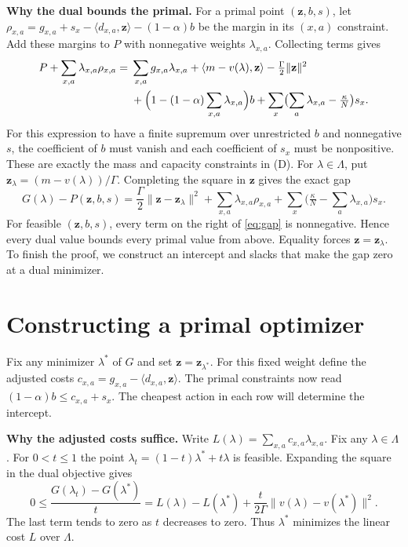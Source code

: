 \documentclass[12pt,a4paper]{article}
\newcommand{\ip}[2]{\langle #1,#2\rangle}
\newcommand{\norm}[1]{\lVert #1\rVert}
\newcommand{\lead}[1]{\par\smallskip\noindent\textbf{#1}\enspace}
\begin{document}
\lead{Why the dual bounds the primal.}
For a primal point \((\mathbf z,b,s)\), let
\(\rho_{x,a}=g_{x,a}+s_x-\ip{d_{x,a}}{\mathbf z}-(1-\alpha)b\) be the margin in its
\((x,a)\) constraint. Add these margins to \(P\) with nonnegative weights
\(\lambda_{x,a}\). Collecting terms gives
\[
\begin{aligned}
 P+\sum_{x,a}\lambda_{x,a}\rho_{x,a}
   ={}&\sum_{x,a}g_{x,a}\lambda_{x,a}
        +\ip{m-v(\lambda)}{\mathbf z}-\tfrac{\Gamma}{2}\norm{\mathbf z}^2\\
     &+\Bigl(1-(1-\alpha)\sum_{x,a}\lambda_{x,a}\Bigr)b
       +\sum_x\bigl(\sum_a\lambda_{x,a}-\tfrac{\kappa}{N}\bigr)s_x .
\end{aligned}
\]
For this expression to have a finite supremum over unrestricted \(b\)
and nonnegative \(s\), the coefficient of \(b\) must vanish and each
coefficient of \(s_x\) must be nonpositive. These are exactly the mass
and capacity constraints in (D). For \(\lambda\in\Lambda\), put
\(\mathbf z_\lambda=(m-v(\lambda))/\Gamma\). Completing the square in \(\mathbf z\)
gives the exact gap
\begin{equation}
  G(\lambda)-P(\mathbf z,b,s)
  =\frac{\Gamma}{2}\norm{\mathbf z-\mathbf z_\lambda}^2
      +\sum_{x,a}\lambda_{x,a}\rho_{x,a}
      +\sum_x\bigl(\tfrac{\kappa}{N}-\sum_a\lambda_{x,a}\bigr)s_x .
  \tag{2}\label{eq:gap}
\end{equation}
For feasible \((\mathbf z,b,s)\), every term on the right of \eqref{eq:gap} is
nonnegative. Hence every dual value bounds every primal value from above.
Equality forces \(\mathbf z=\mathbf z_\lambda\). To finish the proof, we construct an
intercept and slacks that make the gap zero at a dual minimizer.

\newpage
\section*{Constructing a primal optimizer}
Fix any minimizer \(\lambda^*\) of \(G\) and set
\(\mathbf z=\mathbf z_{\lambda^*}\). For this fixed weight define the adjusted costs
\(c_{x,a}=g_{x,a}-\ip{d_{x,a}}{\mathbf z}\). The primal constraints now read
\((1-\alpha)b\le c_{x,a}+s_x\). The cheapest action in each row will determine the intercept.

\lead{Why the adjusted costs suffice.}
Write \(L(\lambda)=\sum_{x,a}c_{x,a}\lambda_{x,a}\). Fix any
\(\lambda\in\Lambda\). For \(0<t\le1\) the point
\(\lambda_t=(1-t)\lambda^*+t\lambda\) is feasible. Expanding the square in
the dual objective gives
\[
  0\le\frac{G(\lambda_t)-G(\lambda^*)}{t}
   = L(\lambda)-L(\lambda^*)
     +\frac{t}{2\Gamma}\norm{v(\lambda)-v(\lambda^*)}^2 .
\]
The last term tends to zero as \(t\) decreases to zero. Thus \(\lambda^*\)
minimizes the linear cost \(L\) over \(\Lambda\).
\end{document}
